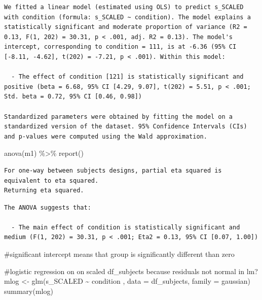 \documentclass[
  letterpaper,
  DIV=11,
  numbers=noendperiod]{scrreprt}
\newenvironment{Shaded}{\begin{snugshade}}{\end{snugshade}}
\newcommand{\AttributeTok}[1]{\textcolor[rgb]{0.40,0.45,0.13}{#1}}
\newcommand{\CommentTok}[1]{\textcolor[rgb]{0.37,0.37,0.37}{#1}}
\newcommand{\FunctionTok}[1]{\textcolor[rgb]{0.28,0.35,0.67}{#1}}
\newcommand{\NormalTok}[1]{\textcolor[rgb]{0.00,0.23,0.31}{#1}}
\newcommand{\OtherTok}[1]{\textcolor[rgb]{0.00,0.23,0.31}{#1}}
\newcommand{\SpecialCharTok}[1]{\textcolor[rgb]{0.37,0.37,0.37}{#1}}
\begin{document}
\begin{verbatim}
We fitted a linear model (estimated using OLS) to predict s_SCALED with condition (formula: s_SCALED ~ condition). The model explains a statistically significant and moderate proportion of variance (R2 = 0.13, F(1, 202) = 30.31, p < .001, adj. R2 = 0.13). The model's intercept, corresponding to condition = 111, is at -6.36 (95% CI [-8.11, -4.62], t(202) = -7.21, p < .001). Within this model:

  - The effect of condition [121] is statistically significant and positive (beta = 6.68, 95% CI [4.29, 9.07], t(202) = 5.51, p < .001; Std. beta = 0.72, 95% CI [0.46, 0.98])

Standardized parameters were obtained by fitting the model on a standardized version of the dataset. 95% Confidence Intervals (CIs) and p-values were computed using the Wald approximation.
\end{verbatim}

\begin{Shaded}
\begin{Highlighting}[]
\FunctionTok{anova}\NormalTok{(m1) }\SpecialCharTok{\%\textgreater{}\%} \FunctionTok{report}\NormalTok{()}
\end{Highlighting}
\end{Shaded}

\begin{verbatim}
For one-way between subjects designs, partial eta squared is equivalent to eta squared.
Returning eta squared.
\end{verbatim}

\begin{verbatim}
The ANOVA suggests that:

  - The main effect of condition is statistically significant and medium (F(1, 202) = 30.31, p < .001; Eta2 = 0.13, 95% CI [0.07, 1.00])
\end{verbatim}

\begin{Shaded}
\begin{Highlighting}[]
\CommentTok{\#significant intercept means that group is significantly different than zero}
\end{Highlighting}
\end{Shaded}

\begin{Shaded}
\begin{Highlighting}[]
\CommentTok{\#logistic regression on on scaled df\_subjects because residuals not normal in lm?}
\NormalTok{mlog }\OtherTok{\textless{}{-}} \FunctionTok{glm}\NormalTok{(s\_SCALED }\SpecialCharTok{\textasciitilde{}}\NormalTok{ condition , }\AttributeTok{data =}\NormalTok{ df\_subjects, }\AttributeTok{family =}\NormalTok{ gaussian)}
\FunctionTok{summary}\NormalTok{(mlog)}
\end{Highlighting}
\end{Shaded}
\end{document}
